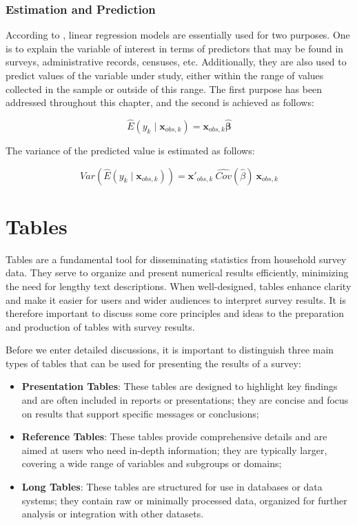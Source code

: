 \documentclass[
  12pt,
]{book}
\begin{document}
\hypertarget{estimation-and-prediction}{%
\subsection{Estimation and Prediction}\label{estimation-and-prediction}}

According to \citet{neter1996applied}, linear regression models are essentially used for two purposes. One is to explain the variable of interest in terms of predictors that may be found in surveys, administrative records, censuses, etc. Additionally, they are also used to predict values of the variable under study, either within the range of values collected in the sample or outside of this range. The first purpose has been addressed throughout this chapter, and the second is achieved as follows:

\[
\widehat{E}(y_{k}\mid\boldsymbol{x}_{obs,k}) = \boldsymbol{x}_{obs,k} \widehat{\boldsymbol{\beta}}
\]

The variance of the predicted value is estimated as follows:

\[
\widehat {Var} \left(\widehat{E}\left(y_{k}\mid \boldsymbol{x}_{obs,k}\right)\right) 
=  \boldsymbol{x}'_{obs,k} \ \widehat {Cov} \left(\widehat{\beta}\right) \ \boldsymbol{x}_{obs,k}
\]

\hypertarget{tables}{%
\chapter{Tables}\label{tables}}

Tables are a fundamental tool for disseminating statistics from household survey data. They serve to organize and present numerical results efficiently, minimizing the need for lengthy text descriptions. When well-designed, tables enhance clarity and make it easier for users and wider audiences to interpret survey results. It is therefore important to discuss some core principles and ideas to the preparation and production of tables with survey results.

Before we enter detailed discussions, it is important to distinguish three main types of tables that can be used for presenting the results of a survey:

\begin{itemize}
\item
  \textbf{Presentation Tables}: These tables are designed to highlight key findings and are often included in reports or presentations; they are concise and focus on results that support specific messages or conclusions;
\item
  \textbf{Reference Tables}: These tables provide comprehensive details and are aimed at users who need in-depth information; they are typically larger, covering a wide range of variables and subgroups or domains;
\item
  \textbf{Long Tables}: These tables are structured for use in databases or data systems; they contain raw or minimally processed data, organized for further analysis or integration with other datasets.
\end{itemize}
\end{document}
